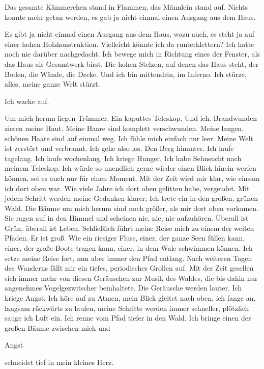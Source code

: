 \documentclass{article}
\begin{document}
	Das gesamte Kämmerchen stand in Flammen, das Männlein stand auf. Nichts konnte mehr getan werden, es gab ja nicht einmal einen Ausgang aus dem Haus.  
	
	Es gibt ja nicht einmal einen Ausgang aus dem Haus, wozu auch, es steht ja auf einer hohen Holzkonstruktion. Vielleicht könnte ich da runterklettern? Ich hatte noch nie darüber nachgedacht. Ich bewege mich in Richtung eines der Fenster, als das Haus als Gesamtwerk birst. Die hohen Stelzen, auf denen das Haus steht, der Boden, die Wände, die Decke. Und ich bin mittendrin, im Inferno. Ich stürze, alles, meine ganze Welt stürzt.
	
	Ich wache auf.  
	
	Um mich herum liegen Trümmer. Ein kaputtes Teleskop. Und ich. Brandwunden zieren meine Haut. Meine Haare sind komplett verschwunden. Meine langen, schönen Haare sind auf einmal weg. Ich fühle mich einfach nur leer. Meine Welt ist zerstört und verbrannt. Ich gehe also los. Den Berg hinunter. Ich laufe tagelang. Ich laufe wochenlang. Ich kriege Hunger. Ich habe Sehnsucht nach meinem Teleskop. Ich würde so unendlich gerne wieder einen Blick hinein werfen können, sei es auch nur für einen Moment. Mit der Zeit wird mir klar, wie einsam ich dort oben war. Wie viele Jahre ich dort oben gelitten habe, vergeudet. Mit jedem Schritt werden meine Gedanken klarer; Ich trete ein in den großen, grünen Wald. Die Bäume um mich herum sind noch größer, als mir dort oben vorkamen. Sie ragen auf in den Himmel und scheinen nie, nie, nie aufzuhören. Überall ist Grün, überall ist Leben. Schließlich führt meine Reise mich zu einem der weiten Pfaden. Er ist groß. Wie ein riesiger Fluss, einer, der ganze Seen füllen kann, einer, der große Boote tragen kann, einer, in dem Wale schwimmen können. Ich setze meine Reise fort, nun aber immer den Pfad entlang. Nach weiteren Tagen des Wanderns fällt mir ein tiefes, periodisches Grollen auf. Mit der Zeit gesellen sich immer mehr von diesen Geräuschen zur Musik des Waldes, die bis dahin nur angenehmes Vogelgezwitscher beinhaltete. Die Geräusche werden lauter. Ich kriege Angst. Ich höre auf zu Atmen, mein Blick gleitet nach oben, ich fange an, langsam rückwärts zu laufen, meine Schritte werden immer schneller, plötzlich sauge ich Luft ein. Ich renne vom Pfad tiefer in den Wald. Ich bringe einen der großen Bäume zwischen mich und  
	
	\medskip
	
	Angst  
	
	\medskip
	
	schneidet tief in mein kleines Herz.  
	
\end{document}
